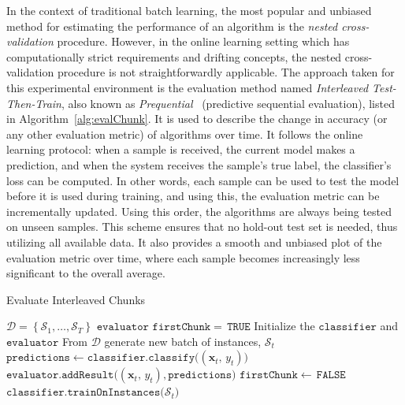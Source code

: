 \documentclass[reqno]{vcuthesis}
\newcommand{\set}[1]{{\left\{#1\right\}}}
\newcommand{\proc}{{\mathcal D}}
\numberwithin{equation}{chapter}
\begin{document}
In the context of traditional batch learning, the most popular and unbiased method for estimating the performance of an algorithm is the \textit{nested cross-validation} procedure. However, in the online learning setting which has computationally strict requirements and drifting concepts, the nested cross-validation procedure is not straightforwardly applicable. The approach taken for this experimental environment is the evaluation method named \textit{Interleaved Test-Then-Train}, also known as \textit{Prequential}~\cite{gama2013evaluating} (predictive sequential evaluation), listed in Algorithm~\ref{alg:evalChunk}. It is used to describe the change in accuracy (or any other evaluation metric) of algorithms over time. It follows the online learning protocol: when a sample is received, the current model makes a prediction, and when the system receives the sample's true label, the classifier's loss can be computed. In other words, each sample can be used to test the model before it is used during training, and using this, the evaluation metric can be incrementally updated. Using this order, the algorithms are always being tested on unseen samples. This scheme ensures that no hold-out test set is needed, thus utilizing all available data. It also provides a smooth and unbiased plot of the evaluation metric over time, where each sample becomes increasingly less significant to the overall average. 
\begin{algorithm}[t!]
\centering \small
\caption{Evaluate Interleaved Chunks}
\label{alg:evalChunk} 
\begin{algorithmic}[1]
\renewcommand{\algorithmicrequire}{\textbf{Input:}}
\renewcommand{\algorithmicensure}{\textbf{Output:}}
\Require $\proc = \set{\mathcal{S}_1,\ldots,\mathcal{S}_T}$
\Ensure  $\mathtt{evaluator}$
\State $\mathtt{firstChunk =\,TRUE}$
\State Initialize the $\mathtt{classifier}$ and $\mathtt{evaluator}$
\While{$\proc \neq \emptyset$}
\State From $\proc$ generate new batch of instances, $\mathcal{S}_t$
\State $\mathtt{predictions} \leftarrow \mathtt{classifier.classify(}(\bm x_t,\, y_t)\mathtt{)}$ 
\State $\mathtt{evaluator.addResult(}(\bm x_t,\, y_t)\mathtt{, predictions)}$
\EndFor
\Else 
\State $\mathtt{firstChunk} \leftarrow\,\mathtt{FALSE}$
\EndIf
\State $\mathtt{classifier.trainOnInstances(}\mathcal{S}_t\mathtt{)}$
\EndWhile
\end{algorithmic} 
\end{algorithm}
\end{document}
